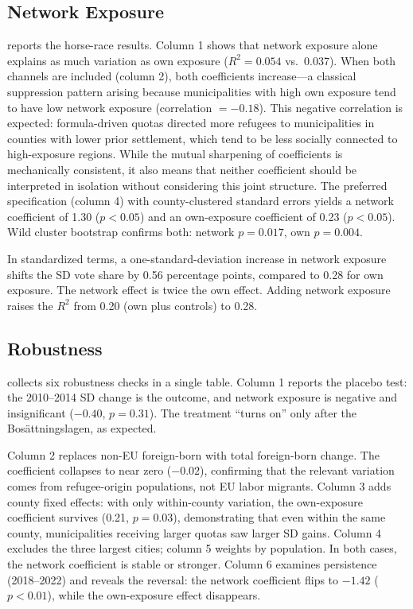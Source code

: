 \documentclass[12pt]{article}
\begin{document}


\subsection{Network Exposure}

 reports the horse-race results. Column 1 shows that network exposure alone explains as much variation as own exposure ($R^2 = 0.054$ vs.\ 0.037). When both channels are included (column 2), both coefficients increase---a classical suppression pattern arising because municipalities with high own exposure tend to have low network exposure (correlation $= -0.18$). This negative correlation is expected: formula-driven quotas directed more refugees to municipalities in counties with lower prior settlement, which tend to be less socially connected to high-exposure regions. While the mutual sharpening of coefficients is mechanically consistent, it also means that neither coefficient should be interpreted in isolation without considering this joint structure. The preferred specification (column 4) with county-clustered standard errors yields a network coefficient of 1.30 ($p < 0.05$) and an own-exposure coefficient of 0.23 ($p < 0.05$). Wild cluster bootstrap confirms both: network $p = 0.017$, own $p = 0.004$.

In standardized terms, a one-standard-deviation increase in network exposure shifts the SD vote share by 0.56 percentage points, compared to 0.28 for own exposure. The network effect is twice the own effect. Adding network exposure raises the $R^2$ from 0.20 (own plus controls) to 0.28.



\subsection{Robustness}

 collects six robustness checks in a single table. Column 1 reports the placebo test: the 2010--2014 SD change is the outcome, and network exposure is negative and insignificant ($-0.40$, $p = 0.31$). The treatment ``turns on'' only after the Bos\"{a}ttningslagen, as expected.

Column 2 replaces non-EU foreign-born with total foreign-born change. The coefficient collapses to near zero ($-0.02$), confirming that the relevant variation comes from refugee-origin populations, not EU labor migrants. Column 3 adds county fixed effects: with only within-county variation, the own-exposure coefficient survives (0.21, $p = 0.03$), demonstrating that even within the same county, municipalities receiving larger quotas saw larger SD gains. Column 4 excludes the three largest cities; column 5 weights by population. In both cases, the network coefficient is stable or stronger. Column 6 examines persistence (2018--2022) and reveals the reversal: the network coefficient flips to $-1.42$ ($p < 0.01$), while the own-exposure effect disappears.
\end{document}

